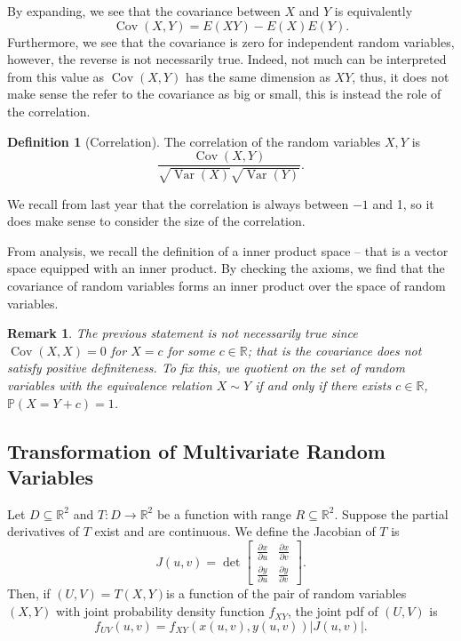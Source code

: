 \documentclass[
]{article}
\newtheorem*{remark}{Remark}
\theoremstyle{definition}
\newtheorem{definition}{Definition}[section]
\begin{document}
By expanding, we see that the covariance between \(X\) and \(Y\) is
equivalently \[\mathop{\mathrm{Cov}}(X, Y) = E(XY) - E(X)E(Y).\]
Furthermore, we see that the covariance is zero for independent random
variables, however, the reverse is not necessarily true. Indeed, not
much can be interpreted from this value as
\(\mathop{\mathrm{Cov}}(X, Y)\) has the same dimension as \(XY\), thus,
it does not make sense the refer to the covariance as big or small, this
is instead the role of the correlation.

\begin{definition}[Correlation]
  The correlation of the random variables \(X, Y\) is
  \[\frac{\mathop{\mathrm{Cov}}(X, Y)}{\sqrt{\mathop{\mathrm{Var}}(X)} \sqrt{\mathop{\mathrm{Var}}(Y)}}.\]
\end{definition}

We recall from last year that the correlation is always between \(-1\)
and 1, so it does make sense to consider the size of the correlation.

From analysis, we recall the definition of a inner product space -- that
is a vector space equipped with an inner product. By checking the
axioms, we find that the covariance of random variables forms an inner
product over the space of random variables.

\begin{remark}
  The previous statement is not necessarily true since \(\mathop{\mathrm{Cov}}(X, X) = 0\) for 
  \(X = c\) for some \(c \in \mathbb{R}\); that is the covariance does not 
  satisfy positive definiteness. To fix this, we quotient on the set of random 
  variables with the equivalence relation \(X \sim Y\) if and only if there exists 
  \(c \in \mathbb{R}\), \(\mathbb{P}(X = Y + c) = 1\).
\end{remark}

\hypertarget{transformation-of-multivariate-random-variables}{%
\subsection{Transformation of Multivariate Random
Variables}\label{transformation-of-multivariate-random-variables}}

Let \(D \subseteq \mathbb{R}^2\) and \(T : D \to \mathbb{R}^2\) be a
function with range \(R \subseteq \mathbb{R}^2\). Suppose the partial
derivatives of \(T\) exist and are continuous. We define the Jacobian of
\(T\) is \[J(u, v) = \det\begin{bmatrix}
  \frac{\partial{x}}{\partial{u}} & \frac{\partial{x}}{\partial{v}}\\
  \frac{\partial{y}}{\partial{u}} & \frac{\partial{y}}{\partial{v}}
\end{bmatrix}.\] Then, if \((U, V) = T(X, Y)\)is a function of the pair
of random variables \((X, Y)\) with joint probability density function
\(f_{XY}\), the joint pdf of \((U, V)\) is
\[f_{UV}(u, v) = f_{XY}(x(u, v), y(u, v))\left|J(u, v)\right|.\]
\end{document}
